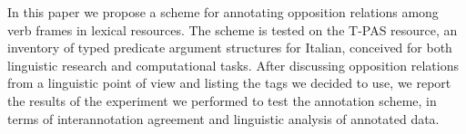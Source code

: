 In this paper we propose a scheme for annotating opposition relations among verb frames in lexical resources. The scheme is tested on the T-PAS resource, an inventory of typed predicate argument structures for Italian, conceived for both linguistic research and computational tasks. After discussing opposition relations from a linguistic point of view and listing the tags we decided to use, we report the results of the experiment we performed to test the annotation scheme, in terms of interannotation agreement and linguistic analysis of annotated data.
